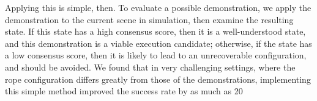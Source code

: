 \documentclass{article}
\begin{document}
Applying this is simple, then. To evaluate a possible demonstration, we apply the demonstration to the current scene in simulation, then examine the resulting state. If this state has a high consensus score, then it is a well-understood state, and this demonstration is a viable execution candidate; otherwise, if the state has a low consensus score, then it is likely to lead to an unrecoverable configuration, and should be avoided. We found that in very challenging settings, where the rope configuration differs greatly from those of the demonstrations, implementing this simple method improved the success rate by as much as 20%

\end{document}
